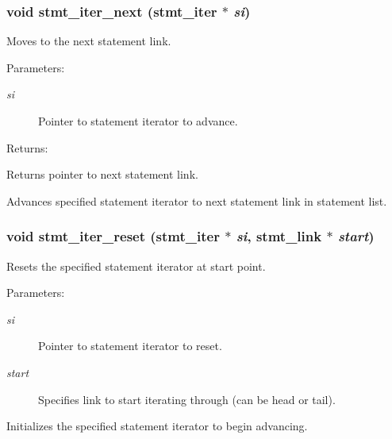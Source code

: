 \subsubsection{\setlength{\rightskip}{0pt plus 5cm}void stmt\_\-iter\_\-next ({\bf stmt\_\-iter} $\ast$ {\em si})}\label{iter_8h_a1}


Moves to the next statement link.

\begin{Desc}
\item[Parameters: ]\par
\begin{description}
\item[{\em 
si}]Pointer to statement iterator to advance.\end{description}
\end{Desc}
\begin{Desc}
\item[Returns: ]\par
Returns pointer to next statement link.\end{Desc}
Advances specified statement iterator to next statement link in statement list. 
\subsubsection{\setlength{\rightskip}{0pt plus 5cm}void stmt\_\-iter\_\-reset ({\bf stmt\_\-iter} $\ast$ {\em si}, {\bf stmt\_\-link} $\ast$ {\em start})}\label{iter_8h_a0}


Resets the specified statement iterator at start point.

\begin{Desc}
\item[Parameters: ]\par
\begin{description}
\item[{\em 
si}]Pointer to statement iterator to reset. \item[{\em 
start}]Specifies link to start iterating through (can be head or tail).\end{description}
\end{Desc}
Initializes the specified statement iterator to begin advancing. 